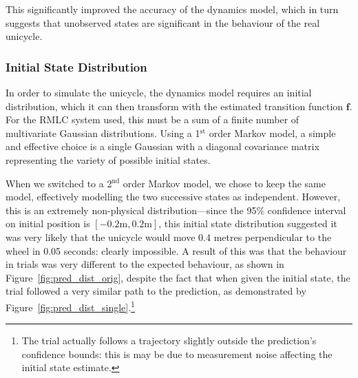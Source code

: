 \documentclass{IIBproject}
\begin{document}
This significantly improved the accuracy of the dynamics model, which in turn
suggests that unobserved states are significant in the behaviour of the real
unicycle. 

\subsubsection{Initial State Distribution}
\label{sec:initial_state_distribution}

In order to simulate the unicycle, the dynamics model requires an initial
distribution, which it can then transform with the estimated transition
function $\boldsymbol{f}$. For the RMLC system used, this must be a sum of a
finite number of multivariate Gaussian distributions. Using a 1$^\textrm{st}$
order Markov model, a simple and effective choice is a single Gaussian with a
diagonal covariance matrix representing the variety of possible initial
states.

When we switched to a 2$^\textrm{nd}$ order Markov model, we chose to keep the
same model, effectively modelling the two successive states as independent.
However, this is an extremely non-physical distribution---since the 95\%
confidence interval on initial position is $[-0.2\textrm{m}, 0.2\textrm{m}]$,
this initial state distribution suggested it was very likely that the unicycle
would move 0.4 metres perpendicular to the wheel in 0.05 seconds: clearly
impossible. A result of this was that the behaviour in trials was very
different to the expected behaviour, as shown in
Figure~\ref{fig:pred_dist_orig}, despite the fact that when given the initial
state, the trial followed a very similar path to the prediction, as
demonstrated by Figure~\ref{fig:pred_dist_single}.\footnote{The
trial actually follows a trajectory slightly outside the prediction's
confidence bounds: this is may be due to measurement noise affecting the
initial state estimate.}
\end{document}
